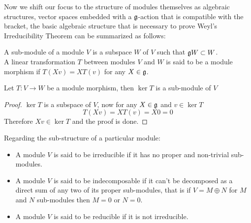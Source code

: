 Now we shift our focus to the structure of modules themselves as algebraic structures, vector spaces embedded with a $\mathfrak{g}$-action that is compatible with the bracket, the basic algebraic structure that is necessary to prove Weyl's Irreducibility Theorem can be summarized as follows:
\begin{defi}
A sub-module of a module $V$ is a subspace $W$ of $V$ such that $\mathfrak{g} W \subset W$.\\
A linear transformation $T$ between modules $V$ and $W$ is said to be a module morphism if $T(Xv)=XT(v)$ for any $X \in \mathfrak{g}$.
\label{module algebra}
\end{defi}

\begin{prop}
	Let $T:V\rightarrow W$ be a module morphism, then $\ker T$ is a sub-module of $V$
	\label{morphism}
\end{prop}
\begin{proof}
	$\ker T$ is a subspace of $V$, now for any $X \in \mathfrak{g}$ and $v \in \ker T$ 
	$$T(Xv) = XT(v) = X0= 0$$
	Therefore $Xv \in \ker T$ and the proof is done.
\end{proof}
\begin{defi}
	Regarding the sub-structure of a particular module:
\begin{itemize} 
	\item A module $V$ is said to be irreducible if it has no proper and non-trivial sub-modules.
	\item A module $V$ is said to be indecomposable if it can't be decomposed as a direct sum of any two of its proper sub-modules, that is if $V=M\oplus N$ for $M$ and $N$ sub-modules then $M=0$ or $N=0$.
	\item A module $V$ is said to be reducible if it is not irreducible.
\end{itemize}
\label{module-types}
\end{defi}
